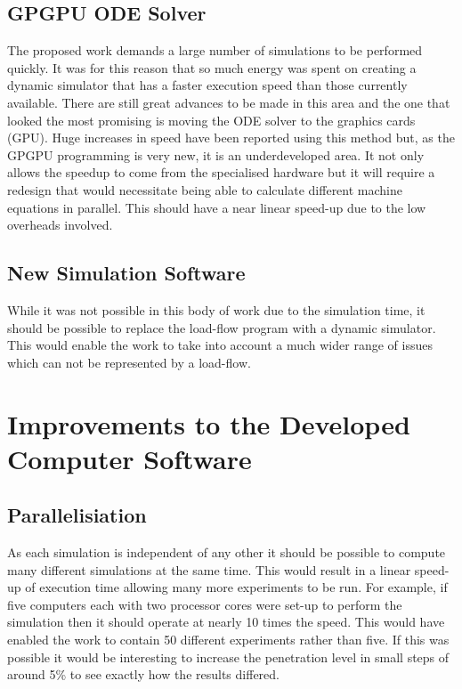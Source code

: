 \documentclass[a4paper,oneside,12pt]{report}
\begin{document}
\subsection{GPGPU ODE Solver}
The proposed work demands a large number of simulations to be performed quickly. It was for this reason that so much energy was spent on creating a dynamic simulator that has a faster execution speed than those currently available. There are still great advances to be made in this area and the one that looked the most promising is moving the ODE solver to the graphics cards (GPU). Huge increases in speed have been reported using this method but, as the GPGPU programming is very new, it is an underdeveloped area. It not only allows the speedup to come from the specialised hardware but it will require a redesign that would necessitate being able to calculate different machine equations in parallel. This should have a near linear speed-up due to the low overheads involved.

\subsection{New Simulation Software}

While it was not possible in this body of work due to the simulation time, it should be possible to replace the load-flow program with a dynamic simulator. This would enable the work to take into account a much wider range of issues which can not be represented by a load-flow.

\section{Improvements to the Developed Computer Software}

\subsection{Parallelisiation}

As each simulation is independent of any other it should be possible to compute many different simulations at the same time. This would result in a linear speed-up of execution time allowing many more experiments to be run. For example, if five computers each with two processor cores were set-up to perform the simulation then it should operate at nearly 10 times the speed. This would have enabled the work to contain 50 different experiments rather than five. If this was possible it would be interesting to increase the penetration level in small steps of around 5\% to see exactly how the results differed.
\end{document}

